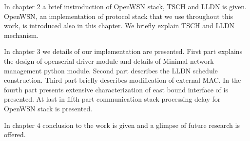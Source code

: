 In chapter 2 a brief instroduction of OpenWSN stack, TSCH and LLDN is given. OpenWSN, an implementation of protocol stack that we use throughout this work, is introduced also in this chapter. We briefly explain TSCH and LLDN mechanism.

In chapter 3 we details of our implementation are presented. First part explains the design of openserial driver module and details of Minimal network management python module. Second part describes the LLDN schedule construction. Third part briefly describes modification of external MAC. In the fourth part presents extensive characterization of east bound interface of is presented. At last in fifth part communication stack processing delay for OpenWSN stack is presented.

In chapter 4 conclusion to the work is given and a glimpse of future research is offered.



